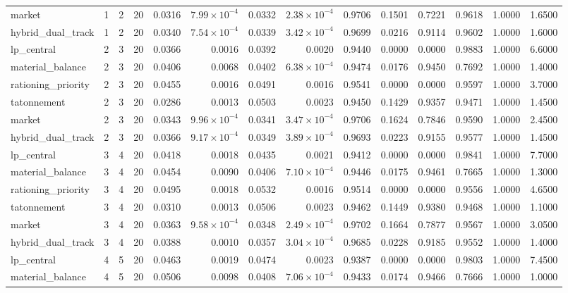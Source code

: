 \begin{table}[htbp]
\begin{tabular}{lrrrrrrrrrrrrr}
market & 1 & 2 & 20 & 0.0316 & $7.99\times10^{-4}$ & 0.0332 & $2.38\times10^{-4}$ & 0.9706 & 0.1501 & 0.7221 & 0.9618 & 1.0000 & 1.6500 \\
hybrid\_dual\_track & 1 & 2 & 20 & 0.0340 & $7.54\times10^{-4}$ & 0.0339 & $3.42\times10^{-4}$ & 0.9699 & 0.0216 & 0.9114 & 0.9602 & 1.0000 & 1.6000 \\
lp\_central & 2 & 3 & 20 & 0.0366 & 0.0016 & 0.0392 & 0.0020 & 0.9440 & 0.0000 & 0.0000 & 0.9883 & 1.0000 & 6.6000 \\
material\_balance & 2 & 3 & 20 & 0.0406 & 0.0068 & 0.0402 & $6.38\times10^{-4}$ & 0.9474 & 0.0176 & 0.9450 & 0.7692 & 1.0000 & 1.4000 \\
rationing\_priority & 2 & 3 & 20 & 0.0455 & 0.0016 & 0.0491 & 0.0016 & 0.9541 & 0.0000 & 0.0000 & 0.9597 & 1.0000 & 3.7000 \\
tatonnement & 2 & 3 & 20 & 0.0286 & 0.0013 & 0.0503 & 0.0023 & 0.9450 & 0.1429 & 0.9357 & 0.9471 & 1.0000 & 1.4500 \\
market & 2 & 3 & 20 & 0.0343 & $9.96\times10^{-4}$ & 0.0341 & $3.47\times10^{-4}$ & 0.9706 & 0.1624 & 0.7846 & 0.9590 & 1.0000 & 2.4500 \\
hybrid\_dual\_track & 2 & 3 & 20 & 0.0366 & $9.17\times10^{-4}$ & 0.0349 & $3.89\times10^{-4}$ & 0.9693 & 0.0223 & 0.9155 & 0.9577 & 1.0000 & 1.4500 \\
lp\_central & 3 & 4 & 20 & 0.0418 & 0.0018 & 0.0435 & 0.0021 & 0.9412 & 0.0000 & 0.0000 & 0.9841 & 1.0000 & 7.7000 \\
material\_balance & 3 & 4 & 20 & 0.0454 & 0.0090 & 0.0406 & $7.10\times10^{-4}$ & 0.9446 & 0.0175 & 0.9461 & 0.7665 & 1.0000 & 1.3000 \\
rationing\_priority & 3 & 4 & 20 & 0.0495 & 0.0018 & 0.0532 & 0.0016 & 0.9514 & 0.0000 & 0.0000 & 0.9556 & 1.0000 & 4.6500 \\
tatonnement & 3 & 4 & 20 & 0.0310 & 0.0013 & 0.0506 & 0.0023 & 0.9462 & 0.1449 & 0.9380 & 0.9468 & 1.0000 & 1.1000 \\
market & 3 & 4 & 20 & 0.0363 & $9.58\times10^{-4}$ & 0.0348 & $2.49\times10^{-4}$ & 0.9702 & 0.1664 & 0.7877 & 0.9567 & 1.0000 & 3.0500 \\
hybrid\_dual\_track & 3 & 4 & 20 & 0.0388 & 0.0010 & 0.0357 & $3.04\times10^{-4}$ & 0.9685 & 0.0228 & 0.9185 & 0.9552 & 1.0000 & 1.4000 \\
lp\_central & 4 & 5 & 20 & 0.0463 & 0.0019 & 0.0474 & 0.0023 & 0.9387 & 0.0000 & 0.0000 & 0.9803 & 1.0000 & 7.4500 \\
material\_balance & 4 & 5 & 20 & 0.0506 & 0.0098 & 0.0408 & $7.06\times10^{-4}$ & 0.9433 & 0.0174 & 0.9466 & 0.7666 & 1.0000 & 1.0000 \\

\end{tabular}
\end{table}
